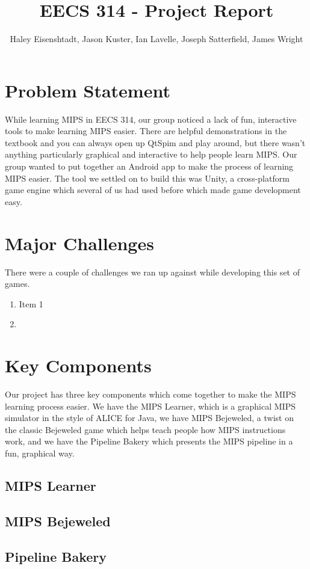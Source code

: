 \documentclass[12pt]{article}
\title{EECS 314 - Project Report}
\author{Haley Eisenshtadt, Jason Kuster, Ian Lavelle, Joseph Satterfield, James Wright}
\begin{document}
	\maketitle
	\section{Problem Statement}
	While learning MIPS in EECS 314, our group noticed a lack of fun, interactive tools to make learning MIPS easier. There are helpful demonstrations in the textbook and you can always open up QtSpim and play around, but there wasn't anything particularly graphical and interactive to help people learn MIPS. Our group wanted to put together an Android app to make the process of learning MIPS easier. The tool we settled on to build this was Unity, a cross-platform game engine which several of us had used before which made game development easy.
	\section{Major Challenges}
	There were a couple of challenges we ran up against while developing this set of games.
	\begin{enumerate}
		\item Item 1
		\item 
	\end{enumerate}
	\section{Key Components}
	Our project has three key components which come together to make the MIPS learning process easier. We have the MIPS Learner, which is a graphical MIPS simulator in the style of ALICE for Java, we have MIPS Bejeweled, a twist on the classic Bejeweled game which helps teach people how MIPS instructions work, and we have the Pipeline Bakery which presents the MIPS pipeline in a fun, graphical way.
	\subsection{MIPS Learner}
	\subsection{MIPS Bejeweled}
	\subsection{Pipeline Bakery}
\end{document}

